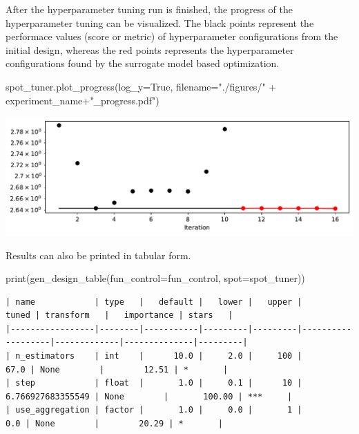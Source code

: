 \documentclass[
  letterpaper,
  DIV=11,
  numbers=noendperiod]{scrreprt}
\newenvironment{Shaded}{\begin{snugshade}}{\end{snugshade}}
\newcommand{\BuiltInTok}[1]{\textcolor[rgb]{0.00,0.23,0.31}{#1}}
\newcommand{\NormalTok}[1]{\textcolor[rgb]{0.00,0.23,0.31}{#1}}
\newcommand{\OperatorTok}[1]{\textcolor[rgb]{0.37,0.37,0.37}{#1}}
\newcommand{\StringTok}[1]{\textcolor[rgb]{0.13,0.47,0.30}{#1}}
\newcommand{\VariableTok}[1]{\textcolor[rgb]{0.07,0.07,0.07}{#1}}
\begin{document}
After the hyperparameter tuning run is finished, the progress of the
hyperparameter tuning can be visualized. The black points represent the
performace values (score or metric) of hyperparameter configurations
from the initial design, whereas the red points represents the
hyperparameter configurations found by the surrogate model based
optimization.

\begin{Shaded}
\begin{Highlighting}[]
\NormalTok{spot\_tuner.plot\_progress(log\_y}\OperatorTok{=}\VariableTok{True}\NormalTok{, filename}\OperatorTok{=}\StringTok{"./figures/"} \OperatorTok{+}\NormalTok{ experiment\_name}\OperatorTok{+}\StringTok{"\_progress.pdf"}\NormalTok{)}
\end{Highlighting}
\end{Shaded}

\includegraphics{025_spot_hpt_river_friedman_amfr_files/figure-pdf/cell-20-output-1.pdf}

Results can also be printed in tabular form.

\begin{Shaded}
\begin{Highlighting}[]
\BuiltInTok{print}\NormalTok{(gen\_design\_table(fun\_control}\OperatorTok{=}\NormalTok{fun\_control, spot}\OperatorTok{=}\NormalTok{spot\_tuner))}
\end{Highlighting}
\end{Shaded}

\begin{verbatim}
| name            | type   |   default |   lower |   upper |             tuned | transform   |   importance | stars   |
|-----------------|--------|-----------|---------|---------|-------------------|-------------|--------------|---------|
| n_estimators    | int    |      10.0 |     2.0 |     100 |              67.0 | None        |        12.51 | *       |
| step            | float  |       1.0 |     0.1 |      10 | 6.766927683355549 | None        |       100.00 | ***     |
| use_aggregation | factor |       1.0 |     0.0 |       1 |               0.0 | None        |        20.29 | *       |
\end{verbatim}
\end{document}
